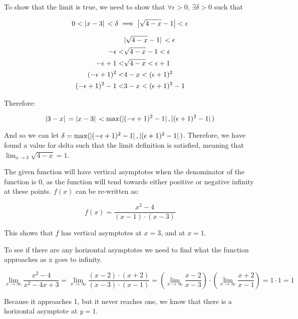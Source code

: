 \documentclass[12pt]{article} %
\begin{document}
\begin{homeworkProblem}

    To show that the limit is true, we need to show that $\forall\epsilon > 0$, $\exists\delta > 0$ such that

    $$
        0 < \abs*{x - 3} < \delta \implies  \abs{\sqrt{4 - x} - 1} < \epsilon
    $$


    \begin{align*}
                                 & \abs*{\sqrt{4- x} - 1}< \epsilon             \\
        - \epsilon             < & \sqrt{4 - x} - 1      < \epsilon             \\
        - \epsilon + 1         < & \sqrt{4 - x}          < \epsilon + 1         \\
        (- \epsilon + 1)^2     < & 4 - x                 < (\epsilon + 1)^2     \\
        (- \epsilon + 1)^2 - 1 < & 3 - x                 < (\epsilon + 1)^2 - 1 \\
    \end{align*}

    Therefore:

    $$
        \abs*{3 - x} = \abs*{x - 3} < \max(\abs*{(- \epsilon + 1)^2 - 1}, \abs*{(\epsilon + 1)^2 - 1})
    $$

    And so we can let $\delta = \max(\abs*{(- \epsilon + 1)^2 - 1}, \abs*{(\epsilon + 1)^2 - 1})$. Therefore, we
    have found a value for delta such that the limit definition is satisfied, meaning that $\lim_{x \to 3} \sqrt{4 - x} = 1$.
\end{homeworkProblem}

\pagebreak

\begin{homeworkProblem}

    The given function will have vertical asymptotes when the denominator of the function is 0, as the function will tend towards either positive or negative infinity at these points.
    $f(x)$ can be re-written as:

    $$
        f(x) = \frac{x^2 - 4}{(x - 1) \cdot (x - 3)}
    $$

    This shows that $f$ has vertical asymptotes at $x = 3$, and at $x = 1$.

    To see if there are any horizontal asymptotes we need to find what the function approaches as x goes to infinity.

    $$
        \lim_{x \to \infty} \frac{x^2 - 4}{x^2 - 4x + 3} = \lim_{x \to \infty} \frac{(x - 2) \cdot (x + 2)}{(x - 3) \cdot (x - 1)} = (\lim_{x \to \infty} \frac{x - 2}{x - 3}) \cdot (\lim_{x \to \infty} \frac{x + 2}{x - 1})= 1 \cdot 1 = 1
    $$

    Because it approaches 1, but it never reaches one, we know that there is a horizontal asymptote at $y = 1$.

\end{homeworkProblem}
\end{document}
